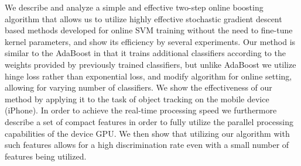 


\begin{abstracts}        %

We describe and analyze a simple and effective two-step online boosting algorithm that allows us to utilize highly effective stochastic gradient descent based methods developed for online SVM training without the need to fine-tune kernel parameters, and show its efficiency by several experiments. Our method is similar to the AdaBoost in that it trains additional classifiers according to the weights provided by previously trained classifiers, but unlike AdaBoost we utilize hinge loss rather than exponential loss, and modify algorithm for online setting, allowing for varying number of classifiers. 
We show the effectiveness of our method by applying it to the task of object tracking on the mobile device (iPhone). In order to achieve the real-time processing speed we furthermore describe a set of compact features in order to fully utilize the parallel processing capabilities of the device GPU. We then show that utilizing our algorithm with such features allows for a high discrimination rate even with a small number of features being utilized.


\end{abstracts}


